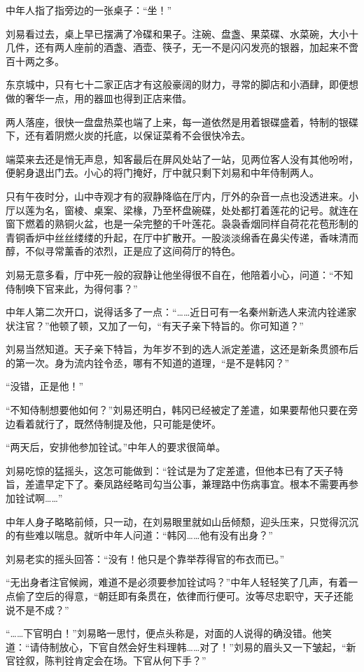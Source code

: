 中年人指了指旁边的一张桌子：“坐！”

刘易看过去，桌上早已摆满了冷碟和果子。注碗、盘盏、果菜碟、水菜碗，大小十几件，还有两人座前的酒盏、酒壶、筷子，无一不是闪闪发亮的银器，加起来不啻百十两之多。

东京城中，只有七十二家正店才有这般豪阔的财力，寻常的脚店和小酒肆，即便想做的奢华一点，用的器皿也得到正店来借。

两人落座，很快一盘盘热菜也端了上来，每一道依然是用着银碟盛着，特制的银碟下，还有着阴燃火炭的托底，以保证菜肴不会很快冷去。

端菜来去还是悄无声息，知客最后在屏风处站了一站，见两位客人没有其他吩咐，便躬身退出门去。小心的将门掩好，厅中就只剩下刘易和中年侍制两人。

只有午夜时分，山中寺观才有的寂静降临在厅内，厅外的杂音一点也没透进来。小厅以莲为名，窗棱、桌案、梁椽，乃至杯盘碗碟，处处都打着莲花的记号。就连在窗下燃着的熟铜火盆，也是一朵完整的千叶莲花。袅袅香烟同样自荷花花苞形制的青铜香炉中丝丝缕缕的升起，在厅中扩散开。一股淡淡绵香在鼻尖传递，香味清而醇，不似寻常薰香的浓烈，正是应了这间荷厅的特色。

刘易无意多看，厅中死一般的寂静让他坐得很不自在，他陪着小心，问道：“不知侍制唤下官来此，为得何事？”

中年人第二次开口，说得话多了一点：“……近日可有一名秦州新选人来流内铨递家状注官？”他顿了顿，又加了一句，“有天子亲下特旨的。你可知道？”

刘易当然知道。天子亲下特旨，为年岁不到的选人派定差遣，这还是新条贯颁布后的第一次。身为流内铨令丞，哪有不知道的道理，“是不是韩冈？”

“没错，正是他！”

“不知侍制想要他如何？”刘易还明白，韩冈已经被定了差遣，如果要帮他只要在旁边看着就行了，既然侍制提及他，只可能是使坏。

“两天后，安排他参加铨试。”中年人的要求很简单。

刘易吃惊的猛摇头，这怎可能做到：“铨试是为了定差遣，但他本已有了天子特旨，差遣早定下了。秦凤路经略司勾当公事，兼理路中伤病事宜。根本不需要再参加铨试啊……”

中年人身子略略前倾，只一动，在刘易眼里就如山岳倾颓，迎头压来，只觉得沉沉的有些难以喘息。就听中年人问道：“韩冈……他有没有出身？”

刘易老实的摇头回答：“没有！他只是个靠举荐得官的布衣而已。”

“无出身者注官候阙，难道不是必须要参加铨试吗？”中年人轻轻笑了几声，有着一点偷了空后的得意，“朝廷即有条贯在，依律而行便可。汝等尽忠职守，天子还能说不是不成？”

“……下官明白！”刘易略一思忖，便点头称是，对面的人说得的确没错。他笑道：“请侍制放心，下官自然会好生料理韩……对了！”刘易的眉头又一下皱起，“新官铨叙，陈判铨肯定会在场。下官从何下手？”

